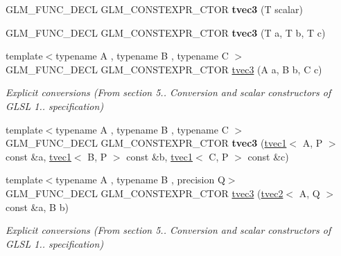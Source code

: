 \begin{DoxyCompactItemize}
G\+L\+M\+\_\+\+F\+U\+N\+C\+\_\+\+D\+E\+CL G\+L\+M\+\_\+\+C\+O\+N\+S\+T\+E\+X\+P\+R\+\_\+\+C\+T\+OR {\bfseries tvec3} (T scalar)
\item 
\mbox{\label{structglm_1_1tvec3_a8f6009dac87a911fe7f7d9fe61069160}} 
G\+L\+M\+\_\+\+F\+U\+N\+C\+\_\+\+D\+E\+CL G\+L\+M\+\_\+\+C\+O\+N\+S\+T\+E\+X\+P\+R\+\_\+\+C\+T\+OR {\bfseries tvec3} (T a, T b, T c)
\item 
\mbox{\label{structglm_1_1tvec3_a29041b5d9ab0f37592aa414a7bae7b7f}} 
{\footnotesize template$<$typename A , typename B , typename C $>$ }\\G\+L\+M\+\_\+\+F\+U\+N\+C\+\_\+\+D\+E\+CL G\+L\+M\+\_\+\+C\+O\+N\+S\+T\+E\+X\+P\+R\+\_\+\+C\+T\+OR \hyperlink{structglm_1_1tvec3_a29041b5d9ab0f37592aa414a7bae7b7f}{tvec3} (A a, B b, C c)
\begin{DoxyCompactList}\small\item\em Explicit conversions (From section 5.. Conversion and scalar constructors of G\+L\+SL 1.. specification) \end{DoxyCompactList}\item 
\mbox{\label{structglm_1_1tvec3_a8a3b26477d6b597f1dc0e98ad72862d0}} 
{\footnotesize template$<$typename A , typename B , typename C $>$ }\\G\+L\+M\+\_\+\+F\+U\+N\+C\+\_\+\+D\+E\+CL G\+L\+M\+\_\+\+C\+O\+N\+S\+T\+E\+X\+P\+R\+\_\+\+C\+T\+OR {\bfseries tvec3} (\hyperlink{structglm_1_1tvec1}{tvec1}$<$ A, P $>$ const \&a, \hyperlink{structglm_1_1tvec1}{tvec1}$<$ B, P $>$ const \&b, \hyperlink{structglm_1_1tvec1}{tvec1}$<$ C, P $>$ const \&c)
\item 
\mbox{\label{structglm_1_1tvec3_a94293c28f040fc93d3f22cbb9d8b6a54}} 
{\footnotesize template$<$typename A , typename B , precision Q$>$ }\\G\+L\+M\+\_\+\+F\+U\+N\+C\+\_\+\+D\+E\+CL G\+L\+M\+\_\+\+C\+O\+N\+S\+T\+E\+X\+P\+R\+\_\+\+C\+T\+OR \hyperlink{structglm_1_1tvec3_a94293c28f040fc93d3f22cbb9d8b6a54}{tvec3} (\hyperlink{structglm_1_1tvec2}{tvec2}$<$ A, Q $>$ const \&a, B b)
\begin{DoxyCompactList}\small\item\em Explicit conversions (From section 5.. Conversion and scalar constructors of G\+L\+SL 1.. specification) \end{DoxyCompactList}\item 

\end{DoxyCompactItemize}
